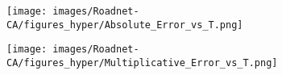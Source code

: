 \begin{figure*}[htbp]
\begin{subfigure}[b]{\textwidth}
	\end{subfigure}
	\begin{subfigure}[b]{\textwidth}
		\centering
		\begin{minipage}[b]{0.05\textwidth}
			\centering
		\end{minipage}%
		\begin{minipage}[b]{0.3\textwidth}
			\centering
			\texttt{[image: images/Roadnet-CA/figures\_hyper/Absolute\_Error\_vs\_T.png]} %
			
		\end{minipage}%
		\begin{minipage}[b]{0.3\textwidth}
			\centering
			
			\texttt{[image: images/Roadnet-CA/figures\_hyper/Multiplicative\_Error\_vs\_T.png]} %
			
		\end{minipage}%
		\begin{minipage}[b]{0.3\textwidth}
			\centering
			

\end{minipage}
\end{subfigure}
\end{figure*}
